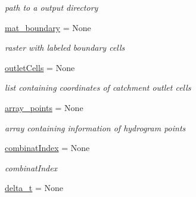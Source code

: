 \begin{DoxyCompactItemize}
\begin{DoxyCompactList}\small\item\em path to a output directory \end{DoxyCompactList}\item 
\hypertarget{namespacesmoderp2d_1_1glob_ae4086074556b7d13d6504bb5885f4856}{\hyperlink{namespacesmoderp2d_1_1glob_ae4086074556b7d13d6504bb5885f4856}{mat\-\_\-boundary} = None}\label{namespacesmoderp2d_1_1glob_ae4086074556b7d13d6504bb5885f4856}

\begin{DoxyCompactList}\small\item\em raster with labeled boundary cells \end{DoxyCompactList}\item 
\hypertarget{namespacesmoderp2d_1_1glob_ae95a9d83d90a91bea836f43fbf622f7b}{\hyperlink{namespacesmoderp2d_1_1glob_ae95a9d83d90a91bea836f43fbf622f7b}{outlet\-Cells} = None}\label{namespacesmoderp2d_1_1glob_ae95a9d83d90a91bea836f43fbf622f7b}

\begin{DoxyCompactList}\small\item\em list containing coordinates of catchment outlet cells \end{DoxyCompactList}\item 
\hypertarget{namespacesmoderp2d_1_1glob_a956965429d590d1ef801a88cddb67298}{\hyperlink{namespacesmoderp2d_1_1glob_a956965429d590d1ef801a88cddb67298}{array\-\_\-points} = None}\label{namespacesmoderp2d_1_1glob_a956965429d590d1ef801a88cddb67298}

\begin{DoxyCompactList}\small\item\em array containing information of hydrogram points \end{DoxyCompactList}\item 
\hypertarget{namespacesmoderp2d_1_1glob_adaa26951c49bda115174213404cce5fa}{\hyperlink{namespacesmoderp2d_1_1glob_adaa26951c49bda115174213404cce5fa}{combinat\-Index} = None}\label{namespacesmoderp2d_1_1glob_adaa26951c49bda115174213404cce5fa}

\begin{DoxyCompactList}\small\item\em combinat\-Index \end{DoxyCompactList}\item 
\hypertarget{namespacesmoderp2d_1_1glob_ae60449c5c237444bbf0b5cd7b307f762}{\hyperlink{namespacesmoderp2d_1_1glob_ae60449c5c237444bbf0b5cd7b307f762}{delta\-\_\-t} = None}\label{namespacesmoderp2d_1_1glob_ae60449c5c237444bbf0b5cd7b307f762}


\end{DoxyCompactItemize}
